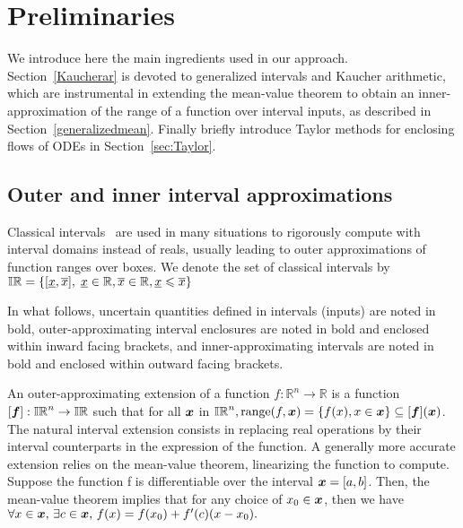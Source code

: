 \documentclass{sig-alternate-05-2015}
\def\R{{\mathbb R}}
\def\bbr{{\Bbb R}}
\def\I{{\Bbb I \Bbb R}}
\begin{document}
\section{Preliminaries}
\label{prelim}

We introduce here the main ingredients used in our approach.  Section~\ref{Kaucherar} is devoted to
generalized intervals and Kaucher arithmetic, which are instrumental in extending 
the mean-value theorem to obtain an inner-approximation of the range of a function over interval inputs, 
as described in Section~\ref{generalizedmean}. Finally briefly introduce Taylor methods for enclosing flows of ODEs in Section~\ref{sec:Taylor}. 

\subsection{Outer and inner interval approximations}
Classical intervals~\cite{Moore66} are used in many situations to rigorously compute with interval
domains instead of reals, usually leading to outer approximations of function
ranges over boxes. 
We denote the set of classical intervals by $\I = \{ [\underline{x},\overline{x}], \; \underline{x} \in \bbr, \overline{x} \in \bbr,  \underline{x} \leqslant \overline{x} \}$

In what follows, 
uncertain quantities defined in intervals (inputs) are noted in bold, outer-approximating interval enclosures are noted in bold and enclosed within inward facing brackets, 
and inner-approximating intervals are noted in bold and enclosed within outward facing 
brackets.

 An outer-approximating extension of a function $f: \R^n \rightarrow \R $ is a function 
$[\f]: \I^n\rightarrow \I$ such that for all $\x$ in $\I^n, \mbox{range}(f,\x)=\{f(x), x \in \x\} \subseteq [\f](\x)$.
The natural interval extension consists in replacing real
operations by their interval counterparts in the expression of the function. 
A generally more accurate extension relies on the mean-value theorem, linearizing the 
function to compute. Suppose the function f is differentiable over the interval 
$\x = [a, b]$. Then, the mean-value theorem implies that for any choice of $x_0 \in \x$, then we have
$ \forall x \in \x, \, \exists c \in \x, \, f(x) = f(x_0) + f'(c) (x-x_0).$
\end{document}
